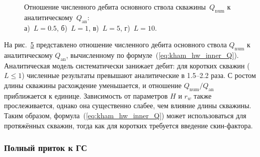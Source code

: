 \documentclass{article}
\begin{document}
\begin{figure}[H]
	\centering
	\begin{subfigure}{0.48\textwidth}
		
		\caption{}
		\label{fig:kham_hw_pipe_edge_effect_L0.5_mrst}
	\end{subfigure}
	\hfill
	\begin{subfigure}{0.48\textwidth}
		
		\caption{}
		\label{fig:kham_hw_pipe_edge_effect_L1_mrst}
	\end{subfigure}

	\begin{subfigure}{0.48\textwidth}
		
		\caption{}
		\label{fig:kham_hw_pipe_edge_effect_L5_mrst}
	\end{subfigure}
	\hfill
	\begin{subfigure}{0.48\textwidth}
		
		\caption{}
		\label{fig:kham_hw_pipe_edge_effect_L10_mrst}
	\end{subfigure}

	\caption{
		Отношение численного дебита основного ствола скважины~$Q_{\text{num}}$ к аналитическому~$Q_{\text{an}}$: \\
		а)~$L=0.5$, б)~$L=1$, в)~$L=5$, г)~$L=10$.
	}
	\label{fig:kham_hw_pipe_edge_effects_mrst}
\end{figure}

На рис.~\ref{fig:kham_hw_pipe_edge_effects_mrst} представлено отношение численного дебита
основного ствола $Q_{\text{num}}$ к аналитическому $Q_{\text{an}}$, вычисленному по формуле~(\ref{eq:kham_hw_inner_Q}).
Аналитическая модель систематически занижает дебит: для коротких скважин ($L \leq 1$) численные результаты
превышают аналитические в 1.5--2.2 раза. С ростом длины скважины расхождение уменьшается, и
отношение $Q_{\text{num}}/Q_{\text{an}}$ приближается к единице.
Зависимость от параметров $H$ и $r_w$ также прослеживается, однако она существенно слабее,
чем влияние длины скважины. Таким образом, формула~(\ref{eq:kham_hw_inner_Q})
может использоваться для протяжённых скважин, тогда как для коротких требуется введение скин-фактора.

\subsubsection{Полный приток к ГС}
\end{document}
